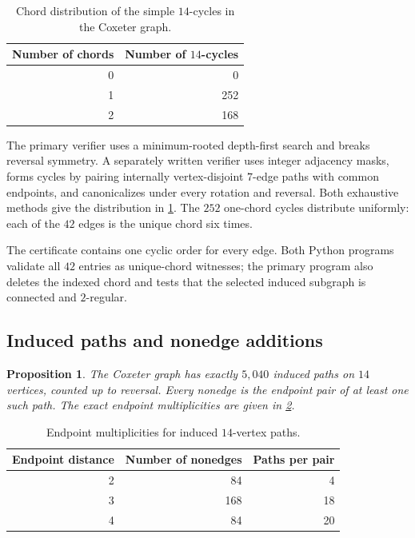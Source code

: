 \documentclass[11pt]{amsart}
\newtheorem{proposition}[proposition]{Proposition}
\theoremstyle{definition}
\theoremstyle{remark}
\begin{document}
\begin{table}[htbp]
\centering
\caption{Chord distribution of the simple \(14\)-cycles in the Coxeter graph.}
\label{tab:c14-chords}
\begin{tabular}{@{}rr@{}}
\toprule
Number of chords & Number of \(14\)-cycles \\
\midrule
0 & 0 \\
1 & 252 \\
2 & 168 \\
\bottomrule
\end{tabular}
\end{table}

The primary verifier uses a minimum-rooted depth-first search and breaks
reversal symmetry.  A separately written verifier uses integer adjacency
masks, forms cycles by pairing internally vertex-disjoint \(7\)-edge paths
with common endpoints, and canonicalizes under every rotation and reversal.
Both exhaustive methods give the distribution in
\cref{tab:c14-chords}.  The \(252\) one-chord cycles distribute uniformly:
each of the \(42\) edges is the unique chord six times.

The certificate contains one cyclic order for every edge.  Both Python
programs validate all \(42\) entries as unique-chord witnesses; the primary
program also deletes the indexed chord and tests that the selected induced
subgraph is connected and \(2\)-regular.

\subsection{Induced paths and nonedge additions}

\begin{proposition}\label{prop:c14-paths}
The Coxeter graph has exactly \(5{,}040\) induced paths on \(14\) vertices,
counted up to reversal.  Every nonedge is the endpoint pair of at least one
such path.  The exact endpoint multiplicities are given in
\cref{tab:c14-paths}.
\end{proposition}

\begin{table}[htbp]
\centering
\caption{Endpoint multiplicities for induced \(14\)-vertex paths.}
\label{tab:c14-paths}
\begin{tabular}{@{}rrr@{}}
\toprule
Endpoint distance & Number of nonedges & Paths per pair \\
\midrule
2 & 84  & 4 \\
3 & 168 & 18 \\
4 & 84  & 20 \\
\bottomrule
\end{tabular}
\end{table}
\end{document}
